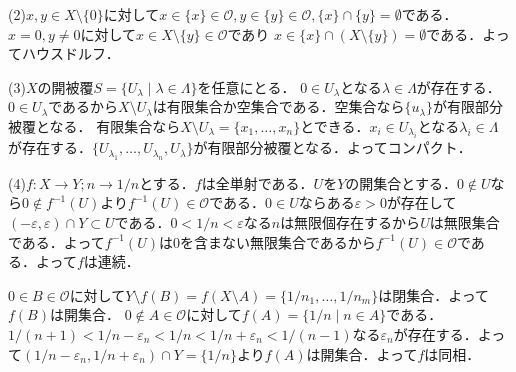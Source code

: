 \documentclass[
		book,
		head_space=20mm,
		foot_space=20mm,
		gutter=10mm,
		line_length=190mm
]{jlreq}
\begin{document}
(2)$x,y \in X \setminus \{0\}$に対して$x \in \{ x\} \in \mathcal{O},y\in \{ y\} \in \mathcal{O} ,\{x\} \cap \{ y\}=\emptyset$である．
$x=0,y\neq 0$に対して$x \in X\setminus \{ y\} \in \mathcal{O}$であり
$x \in \{ x\} \cap (X\setminus \{ y\})=\emptyset$である．よってハウスドルフ．

(3)$X$の開被覆$S=\{ U_\lambda \mid \lambda \in \Lambda\}$を任意にとる．
$0 \in U_{\lambda}$となる$\lambda\in \Lambda$が存在する．$0 \in U_{\lambda}$であるから$X\setminus U_{\lambda}$は有限集合か空集合である．空集合なら$\{ u_\lambda\}$が有限部分被覆となる．
有限集合なら$X\setminus U_{\lambda}=\{ x_1,\dots,x_n\}$とできる．$x_i \in U_{\lambda_i}$となる$\lambda_i \in \Lambda$が存在する．$\{ U_{\lambda_1},\dots,U_{\lambda_n},U_\lambda \}$が有限部分被覆となる．よってコンパクト．

(4)$f \colon X \rightarrow Y;n \rightarrow 1/n$とする．$f$は全単射である．$U$を$Y$の開集合とする．$0 \notin U$なら$0\notin f^{-1}(U)$より$f^{-1}(U)\in \mathcal{O}$である．$0 \in U$ならある$\varepsilon>0$が存在して$(-\varepsilon,\varepsilon)\cap Y \subset U$である．$0<1/n <\varepsilon$なる$n$は無限個存在するから$U$は無限集合である．よって$f^{-1}(U)$は$0$を含まない無限集合であるから$f^{-1}(U)\in \mathcal{O}$である．よって$f$は連続．

$0 \in B \in \mathcal{O}$に対して$Y\setminus f(B)=f(X\setminus A)=\{ 1/n_1,\dots,1/n_m\}$は閉集合．よって$f(B)$は開集合．
$0 \notin A \in \mathcal{O}$に対して$f(A)=\{ 1/n \mid n \in A\}$である．
$1/(n+1)<1/n-\varepsilon_n<1/n<1/n+\varepsilon_n<1/(n-1)$なる$\varepsilon_n$が存在する．よって$(1/n-\varepsilon_n,1/n+\varepsilon_n)\cap Y = \{ 1/n \}$より$f(A)$は開集合．よって$f$は同相．
\end{document}
